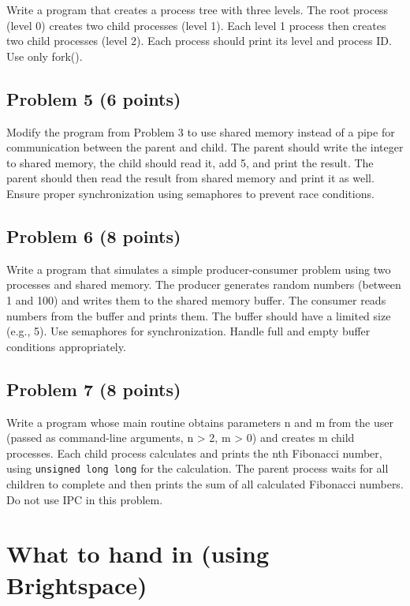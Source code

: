 \documentclass{article}
\begin{document}
Write a program that creates a process tree with three levels. The root process (level 0) creates two child processes (level 1). Each level 1 process then creates two child processes (level 2). Each process should print its level and process ID.  Use only fork().


\subsection*{Problem 5 (6 points)}

Modify the program from Problem 3 to use shared memory instead of a pipe for communication between the parent and child.  The parent should write the integer to shared memory, the child should read it, add 5, and print the result. The parent should then read the result from shared memory and print it as well. Ensure proper synchronization using semaphores to prevent race conditions.


\subsection*{Problem 6 (8 points)}

Write a program that simulates a simple producer-consumer problem using two processes and shared memory. The producer generates random numbers (between 1 and 100) and writes them to the shared memory buffer. The consumer reads numbers from the buffer and prints them. The buffer should have a limited size (e.g., 5).  Use semaphores for synchronization. Handle full and empty buffer conditions appropriately.


\subsection*{Problem 7 (8 points)}

Write a program whose main routine obtains parameters n and m from the user (passed as command-line arguments, n > 2, m > 0) and creates m child processes. Each child process calculates and prints the nth Fibonacci number, using \texttt{unsigned long long} for the calculation. The parent process waits for all children to complete and then prints the sum of all calculated Fibonacci numbers. Do not use IPC in this problem.


\section*{What to hand in (using Brightspace)}
\end{document}
